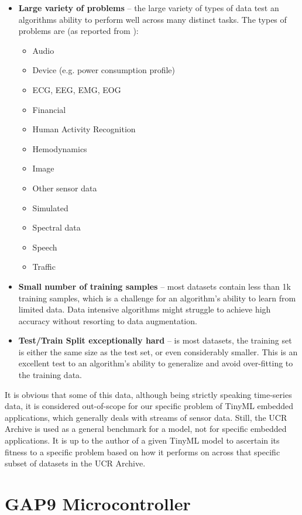 \begin{itemize}
    \item \textbf{Large variety of problems} -- the large variety of types of data test an algorithms ability to perform well across many distinct tasks. The types of problems are (as reported from \cite{UCRArchive2018}):
        \begin{itemize}
            \item Audio
            \item Device (e.g. power consumption profile)
            \item ECG, EEG, EMG, EOG
            \item Financial
            \item Human Activity Recognition
            \item Hemodynamics
            \item Image
            \item Other sensor data
            \item Simulated
            \item Spectral data
            \item Speech
            \item Traffic
        \end{itemize}
    \item \textbf{Small number of training samples} -- most datasets contain less than 1k training samples, which is a challenge for an algorithm's ability to learn from limited data. Data intensive algorithms might struggle to achieve high accuracy without resorting to data augmentation.
    \item \textbf{Test/Train Split exceptionally hard} -- is most datasets, the training set is either the same size as the test set, or even considerably smaller. This is an excellent test to an algorithm's ability to generalize and avoid over-fitting to the training data.
\end{itemize}
It is obvious that some of this data, although being strictly speaking time-series data, it is considered out-of-scope for our specific problem of TinyML embedded applications, which generally deals with streams of sensor data. Still, the UCR Archive is used as a general benchmark for a model, not for specific embedded applications.
It is up to the author of a given TinyML model to ascertain its fitness to a specific problem based on how it performs on across that specific subset of datasets in the UCR Archive.

\section{GAP9 Microcontroller}

